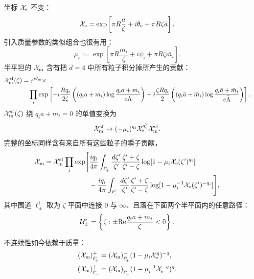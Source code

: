 坐标 $\mathcal{X}_{\mathrm{e}}$ 不变：
\begin{equation}
\mathcal{X}_{\mathrm{e}} = \exp \left[ \pi R \frac{a}{\zeta} + i \theta_{\mathrm{e}} +
\pi R \zeta \bar{a} \right].
\end{equation}
引入质量参数的类似组合也很有用：
\begin{equation}
\mu_i := \exp \left[ \pi R \frac{m_i}{\zeta} + i \psi_i + \pi R
\zeta \bar{m_i} \right].
\end{equation}
半平坦的 $\mathcal{X}_{\mathrm{m}}$ 含有把 $d=4$ 中所有粒子积分掉所产生的贡献：
\begin{equation}
\begin{aligned}
\mathcal{X}_{\mathrm{m}}^{\mathrm{sf}}(\zeta) &= e^{i \theta_{\mathrm{m}}} \times \\
&\quad \prod_i \exp\left[-i\frac{R q_i}{2
\zeta} \left((q_i a+m_i) \log\frac{q_i a+ m_i}{e \Lambda} \right) +
i \frac{\zeta R q_i}{2} \left((q_i \bar a + \bar
m_i)\log\frac{q_i \bar a+ \bar m_i}{e\bar \Lambda} \right)\right].
\end{aligned}
\end{equation}
$\mathcal{X}_{\mathrm{m}}^{\mathrm{sf}}(\zeta)$ 绕 $q_i a+m_i =0$ 的单值变换为
\begin{equation}\label{eq:mono2-masses}
\mathcal{X}_{\mathrm{m}}^{\mathrm{sf}} \to (-\mu_i)^{q_i} \mathcal{X}_{\mathrm{e}}^{q_i^2}
\mathcal{X}_{\mathrm{m}}^{\mathrm{sf}}.
\end{equation}
完整的坐标同样含有来自所有这些粒子的瞬子贡献，
\begin{equation}\label{eq:FullX2-masses}
\begin{aligned}
\mathcal{X}_{\mathrm{m}} = \mathcal{X}_{\mathrm{m}}^{\mathrm{sf}} \prod_i \exp\Biggl[ & \frac{i q_i}{4\pi}
\int_{\ell^i_+} \frac{d \zeta'}{\zeta'}
\frac{\zeta' + \zeta}{\zeta' - \zeta} \log[1-\mu_i \mathcal{X}_{\mathrm{e}}(\zeta')^{q_i}] \\
& - \frac{i q_i}{4\pi}\int_{\ell^i_-}
\frac{d \zeta'}{\zeta'} \frac{\zeta' + \zeta}{\zeta' - \zeta}
\log[1-\mu_i^{-1} \mathcal{X}_{\mathrm{e}}(\zeta')^{-q_i}] \Biggr],
\end{aligned}
\end{equation}
其中围道 $\ell^i_\pm$ 取为 $\zeta$ 平面中连接 $0$ 与 $\infty$、且落在下面两个半平面内的任意路径：
\begin{equation}
\mathcal{U}^i_\pm = \left\{ \zeta: \pm {\rm Re} \frac{q_i a + m_i}{\zeta} < 0 \right\}.
\end{equation}

不连续性如今依赖于质量：
\begin{subequations} \label{eq:X2-disc-masses}
\begin{align}
(\mathcal{X}_{\mathrm{m}})_{\ell^i_+}^{+} &= (\mathcal{X}_{\mathrm{m}})_{\ell^i_+}^{-} (1 - \mu_i \mathcal{X}_{\mathrm{e}}^q)^{-q}, \\
(\mathcal{X}_{\mathrm{m}})_{\ell^i_-}^{+} &= (\mathcal{X}_{\mathrm{m}})_{\ell^i_-}^{-} (1 - \mu_i^{-1}
\mathcal{X}_{\mathrm{e}}^{-q})^q.
\end{align}
\end{subequations}

